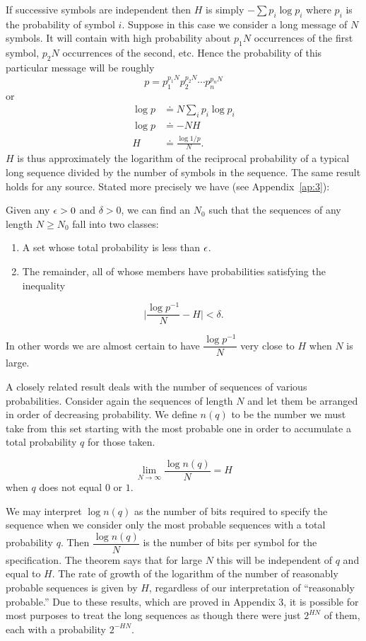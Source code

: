 If successive symbols are independent then $H$ is simply $- \sum p_i
\log p_i$ where $p_i$ is the probability of symbol $i$.  Suppose in
this case we consider a long message of $N$ symbols.  It will contain
with high probability about $p_1 N$ occurrences of the first symbol,
$p_2 N$ occurrences of the second, etc.  Hence the probability of this
particular message will be roughly
$$
p= p_1^{p_1 N} p_2^{p_2 N} \dotsm p_n^{p_n N}
$$
or
\begin{align*}
\log p &\doteq N \sum_i p_i \log p_i\\
\log p & \doteq - N H \\
H & \doteq \frac{\log 1/p}{N}.
\end{align*}
$H$ is thus approximately the logarithm of the reciprocal probability of
a typical long sequence divided by the number of symbols in the sequence.
The same result holds for any source.  Stated more precisely we have
(see Appendix~\ref{ap:3}):

\begin{theorem}
\label{thm:3}
Given any $\epsilon > 0$ and $\delta > 0$, we can find an $N_0$ such that
the sequences of any length $N \ge N_0$ fall into two classes:
\begin{enumerate}
\item
A set whose total probability is less than $\epsilon$.
\item
The remainder, all of whose members have probabilities satisfying the
inequality
\end{enumerate}
$$
\biggl| \frac{\log p^{-1}}{N} - H \biggr| < \delta.
$$
\end{theorem}
In other words we are almost certain to have $\dfrac{\log p^{-1}}{N}$
very close to $H$ when $N$ is large.

A closely related result deals with the number of sequences of various
probabilities.  Consider again the sequences of length $N$ and let them
be arranged in order of decreasing probability.  We define $n(q)$ to be
the number we must take from this set starting with the most probable
one in order to accumulate a total probability $q$ for those taken.
\begin{theorem}
\label{thm:4}
$$
\lim_{N\to\infty} \frac{\log n(q)}{N} = H
$$
when $q$ does not equal $0$ or $1$.
\end{theorem}

We may interpret $\log n(q)$ as the number of bits required to specify
the sequence when we consider only the most probable sequences with a
total probability $q$.  Then $\dfrac{\log n(q)}{N}$ is the number of bits
per symbol for the specification.  The theorem says that for large $N$
this will be independent of $q$ and equal to $H$.  The rate of growth of
the logarithm of the number of reasonably probable sequences is given
by $H$, regardless of our interpretation of ``reasonably probable.''
Due to these results, which are proved in Appendix 3, it is possible
for most purposes to treat the long sequences as though there were just
$2^{HN}$ of them, each with a probability $2^{-HN}$.

